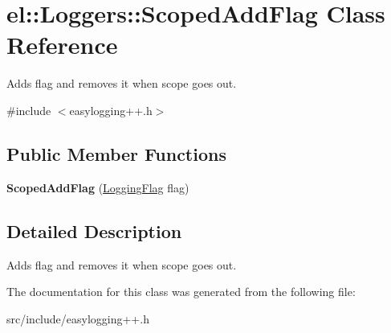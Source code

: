 \hypertarget{classel_1_1_loggers_1_1_scoped_add_flag}{}\section{el\+:\+:Loggers\+:\+:Scoped\+Add\+Flag Class Reference}
\label{classel_1_1_loggers_1_1_scoped_add_flag}


Adds flag and removes it when scope goes out.  




{\ttfamily \#include $<$easylogging++.\+h$>$}

\subsection*{Public Member Functions}
\begin{DoxyCompactItemize}
\item 
\mbox{\label{classel_1_1_loggers_1_1_scoped_add_flag_a13e0b1052cd1a7a15fae63fd6454d598}} 
{\bfseries Scoped\+Add\+Flag} (\hyperlink{namespaceel_a2784aacd04cb7816ac1c0b20fcbf83cb}{Logging\+Flag} flag)
\end{DoxyCompactItemize}


\subsection{Detailed Description}
Adds flag and removes it when scope goes out. 

The documentation for this class was generated from the following file\+:\begin{DoxyCompactItemize}
\item 
src/include/easylogging++.\+h\end{DoxyCompactItemize}
